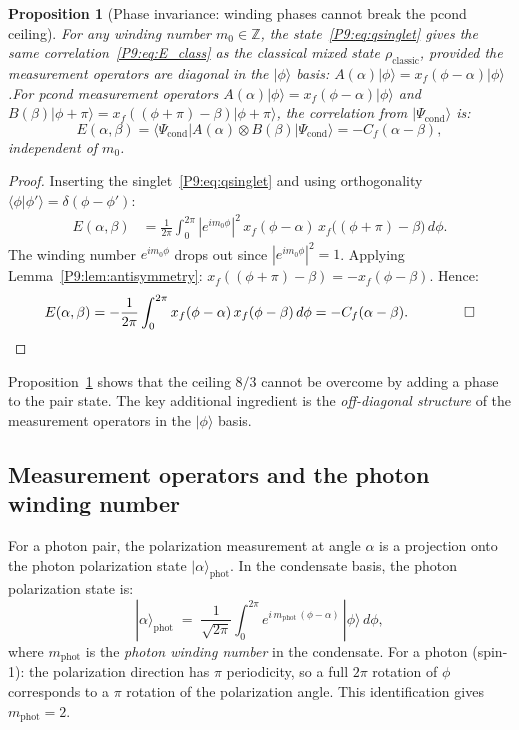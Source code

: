 \documentclass[11pt,a4paper]{article}
\newtheorem{proposition}[theorem]{Proposition}
\theoremstyle{definition}
\theoremstyle{remark}
\newcommand{\ZZ}{\mathbb{Z}}
\begin{document}
\begin{proposition}[Phase invariance: winding phases cannot break the pcond ceiling]
\label{P9:prop:phase_invariance}
For any winding number $m_0\in\ZZ$, the state~\eqref{P9:eq:qsinglet}
gives the \emph{same} correlation~\eqref{P9:eq:E_class} as the classical
mixed state $\rho_\mathrm{classic}$, provided the measurement operators
are diagonal in the $|\phi\rangle$ basis:
$A(\alpha)|\phi\rangle = x_f(\phi-\alpha)|\phi\rangle$.For pcond measurement operators $A(\alpha)|\phi\rangle = x_f(\phi-\alpha)|\phi\rangle$
and $B(\beta)|\phi+\pi\rangle = x_f((\phi+\pi)-\beta)|\phi+\pi\rangle$,
the correlation from $|\Psi_\mathrm{cond}\rangle$ is:
 \begin{equation}
  E(\alpha,\beta)
  = \langle\Psi_\mathrm{cond}|A(\alpha)\otimes B(\beta)|\Psi_\mathrm{cond}\rangle
  = -C_f(\alpha-\beta),
\end{equation}
independent of $m_0$.
\end{proposition}

\begin{proof}
Inserting the singlet~\eqref{P9:eq:qsinglet} and using orthogonality
$\langle\phi|\phi'\rangle=\delta(\phi-\phi')$:
\begin{align}
  E(\alpha,\beta)
  &= \frac{1}{2\pi}\int_0^{2\pi}
  |e^{im_0\phi}|^2\,
  x_f(\phi-\alpha)\,
  x_f\bigl((\phi+\pi)-\beta\bigr)\,d\phi.
\end{align}
The winding number $e^{im_0\phi}$ drops out since $|e^{im_0\phi}|^2=1$.
Applying Lemma~\ref{P9:lem:antisymmetry}: $x_f((\phi+\pi)-\beta) = -x_f(\phi-\beta)$.
Hence:
\begin{equation}
  E(\alpha,\beta)
  = -\frac{1}{2\pi}\int_0^{2\pi}x_f(\phi-\alpha)\,x_f(\phi-\beta)\,d\phi
  = -C_f(\alpha-\beta). \qquad\qed
\end{equation}
\end{proof}


Proposition~\ref{P9:prop:phase_invariance} shows that the ceiling $8/3$ cannot be
overcome by adding a phase to the pair state.
The key additional ingredient is the \emph{off-diagonal structure} of the
measurement operators in the $|\phi\rangle$ basis.
 
\subsection{Measurement operators and the photon winding number}
 
For a photon pair, the polarization measurement at angle $\alpha$ is
a projection onto the photon polarization state $|\alpha\rangle_\mathrm{phot}$.
In the condensate basis, the photon polarization state is:
\begin{equation}
  |\alpha\rangle_\mathrm{phot}
  \;=\; \frac{1}{\sqrt{2\pi}}
  \int_0^{2\pi} e^{i\,m_\mathrm{phot}\,(\phi-\alpha)}\,|\phi\rangle\,d\phi,
  \label{P9:eq:photon_state}
\end{equation}
where $m_\mathrm{phot}$ is the \emph{photon winding number} in the condensate.
For a photon (spin-1): the polarization direction has $\pi$ periodicity,
so a full $2\pi$ rotation of $\phi$ corresponds to a $\pi$ rotation of the
polarization angle. This identification gives $m_\mathrm{phot}=2$.
 
\end{document}
